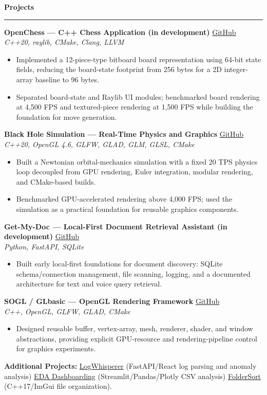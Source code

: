 \documentclass[11pt,a4paper]{article}
\newcommand{\sectionline}[1]{\vspace{6pt}\textbf{#1}\par\vspace{2pt}\hrule\vspace{3pt}}
\begin{document}
\sectionline{Projects}
\textbf{OpenChess --- C++ Chess Application (in development)} \hfill \href{https://github.com/KrishMaheshwariDev/OpenChess}{GitHub}\\
\textit{C++20, raylib, CMake, Clang, LLVM}
\begin{itemize}
  \item Implemented a 12-piece-type bitboard board representation using 64-bit state fields, reducing the board-state footprint from 256 bytes for a 2D integer-array baseline to 96 bytes.
  \item Separated board-state and Raylib UI modules; benchmarked board rendering at 4,500 FPS and textured-piece rendering at 1,500 FPS while building the foundation for move generation.
\end{itemize}
\textbf{Black Hole Simulation --- Real-Time Physics and Graphics} \hfill \href{https://github.com/KrishMaheshwariDev/Black-Hole-Simulation}{GitHub}\\
\textit{C++20, OpenGL 4.6, GLFW, GLAD, GLM, GLSL, CMake}
\begin{itemize}
  \item Built a Newtonian orbital-mechanics simulation with a fixed 20 TPS physics loop decoupled from GPU rendering, Euler integration, modular rendering, and CMake-based builds.
  \item Benchmarked GPU-accelerated rendering above 4,000 FPS; used the simulation as a practical foundation for reusable graphics components.
\end{itemize}
\textbf{Get-My-Doc --- Local-First Document Retrieval Assistant (in development)} \hfill \href{https://github.com/KrishMaheshwariDev/Get-My-Doc}{GitHub}\\
\textit{Python, FastAPI, SQLite}
\begin{itemize}
  \item Built early local-first foundations for document discovery: SQLite schema/connection management, file scanning, logging, and a documented architecture for text and voice query retrieval.
\end{itemize}
\textbf{SOGL / GLbasic --- OpenGL Rendering Framework} \hfill \href{https://github.com/KrishMaheshwariDev/Simple-OpenGL}{GitHub}\\
\textit{C++, OpenGL, GLFW, GLAD, CMake}
\begin{itemize}
  \item Designed reusable buffer, vertex-array, mesh, renderer, shader, and window abstractions, providing explicit GPU-resource and rendering-pipeline control for graphics experiments.
\end{itemize}
\textbf{Additional Projects:} \href{https://github.com/KrishMaheshwariDev/Devai-log-whisperer}{LogWhisperer} (FastAPI/React log parsing and anomaly analysis) \textbar{} \href{https://github.com/KrishMaheshwariDev/EDA-DashingBoard}{EDA Dashboarding} (Streamlit/Pandas/Plotly CSV analysis) \textbar{} \href{https://github.com/KrishMaheshwariDev/FileOrganiser}{FolderSort} (C++17/ImGui file organization).
\end{document}
